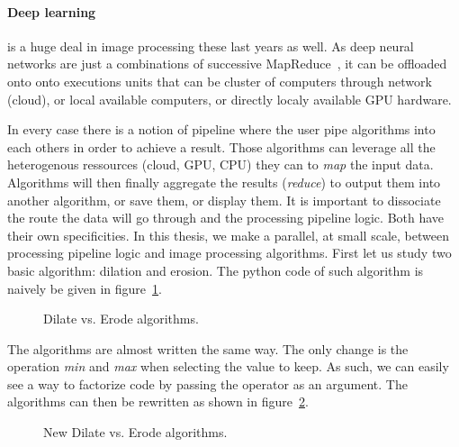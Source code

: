 \paragraph{Deep learning} is a huge deal in image processing these last years as well. As deep neural networks are just
a combinations of successive MapReduce~\parencite{dean.2008.mapreduce}, it can be offloaded onto onto executions units
that can be cluster of computers through network (cloud), or local available computers, or directly localy available GPU
hardware.

In every case there is a notion of pipeline where the user pipe algorithms into each others in order to achieve a
result. Those algorithms can leverage all the heterogenous ressources (cloud, GPU, CPU) they can to \emph{map} the input
data. Algorithms will then finally aggregate the results (\emph{reduce}) to output them into another algorithm, or save
them, or display them. It is important to dissociate the route the data will go through and the processing pipeline
logic. Both have their own specificities. In this thesis, we make a parallel, at small scale, between processing
pipeline logic and image processing algorithms. First let us study two basic algorithm: dilation and erosion. The python
code of such algorithm is naively be given in figure~\ref{code:erode.dilate}.

\begin{figure}[tbh]
  \centering
  \hfil
  \caption{Dilate vs. Erode algorithms.}
  \label{code:erode.dilate}
\end{figure}

The algorithms are almost written the same way. The only change is the operation \emph{min} and \emph{max} when
selecting the value to keep. As such, we can easily see a way to factorize code by passing the operator as an argument.
The algorithms can then be rewritten as shown in figure~\ref{code:erode.dilate.factorized}.

\begin{figure}[tbh]
  \centering
  \vfil
  \smallskip
  \hfil
  \caption{New Dilate vs. Erode algorithms.}
  \label{code:erode.dilate.factorized}
\end{figure}

